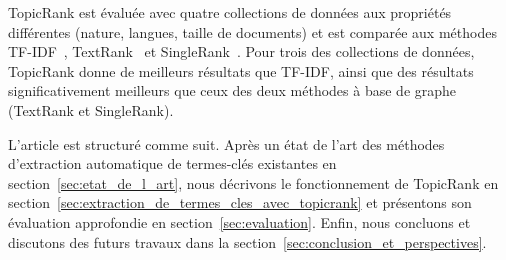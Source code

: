   TopicRank est évaluée avec quatre collections de données aux propriétés
  différentes (nature, langues, taille de documents) et est comparée aux
  méthodes TF-IDF~\cite{jones1972tfidf}, TextRank~\cite{mihalcea2004textrank} et
  SingleRank~\cite{wan2008expandrank}. Pour trois des collections de données,
  TopicRank donne de meilleurs résultats que TF-IDF, ainsi que des résultats
  significativement meilleurs que ceux des deux méthodes à base de graphe
  (TextRank et SingleRank).

  L'article est structuré comme suit. Après un état de l'art des méthodes
  d'extraction automatique de termes-clés existantes en
  section~\ref{sec:etat_de_l_art}, nous décrivons le fonctionnement de TopicRank
  en section~\ref{sec:extraction_de_termes_cles_avec_topicrank} et présentons
  son évaluation approfondie en section~\ref{sec:evaluation}. Enfin, nous
  concluons et discutons des futurs travaux dans la
  section~\ref{sec:conclusion_et_perspectives}.

